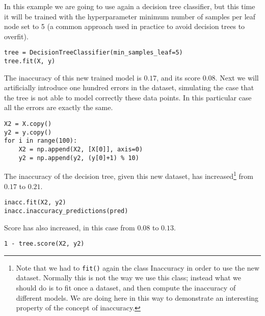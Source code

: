 \begin{example}
\label{ex:machine_learning:inaccuracy:one_hundred_errors}
In this example we are going to use again a decision tree classifier, but this time it will be trained with the hyperparameter minimum number of samples per leaf node set to 5 (a common approach used in practice to avoid decision trees to overfit).

\begin{sourcecode}
{\scriptsize \begin{verbatim}
tree = DecisionTreeClassifier(min_samples_leaf=5)
tree.fit(X, y)
\end{verbatim}}
\end{sourcecode}

The inaccuracy of this new trained model is $0.17$, and its score $0.08$. Next we will artificially introduce one hundred errors in the dataset, simulating the case that the tree is not able to model correctly these data points. In this particular case all the errors are exactly the same.

\begin{sourcecode}
{\scriptsize \begin{verbatim}
X2 = X.copy()
y2 = y.copy()
for i in range(100):
    X2 = np.append(X2, [X[0]], axis=0)
    y2 = np.append(y2, (y[0]+1) % 10)
\end{verbatim}}
\end{sourcecode}

The inaccuracy of the decision tree, given this new dataset, has increased\footnote{Note that we had to \texttt{fit()} again the class Inaccuracy in order to use the new dataset. Normally this is not the way we use this class; instead what we should do is to fit once a dataset, and then compute the inaccuracy of different models. We are doing here in this way to demonstrate an interesting property of the concept of inaccuracy.} from $0.17$ to $0.21$.

\begin{sourcecode}
{\scriptsize \begin{verbatim}
inacc.fit(X2, y2)
inacc.inaccuracy_predictions(pred)
\end{verbatim}}
\end{sourcecode}

Score has also increased, in this case from $0.08$ to $0.13$.

\begin{sourcecode}
{\scriptsize \begin{verbatim}
1 - tree.score(X2, y2)
\end{verbatim}}
\end{sourcecode}


\end{example}

